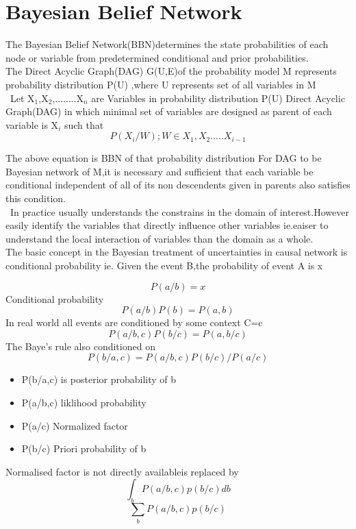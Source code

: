 \section{Bayesian Belief Network}
The Bayesian Belief Network(BBN)determines the state probabilities of each node or variable from predetermined conditional and prior probabilities.
\\ The Direct Acyclic Graph(DAG) G(U,E)of the probability model M represents probability distribution P(U) ,where U represents set of all variables in M
\\\ Let X${_1}$,X${_2}$,........X${_n}$ are Variables in probability distribution P(U)
Direct Acyclic Graph(DAG) in which minimal set of variables are designed as parent of each variable is X${_i}$ such that
\begin{equation}\label{}
   P(X{_i}/W);   W\in{X{_1},X{_2}.....X{_{i-1}}}
\end{equation}

The above equation is BBN of that probability distribution
For DAG to be Bayesian network of M,it is necessary and sufficient that each variable be conditional independent of all of its non descendents given in parents also satisfies this condition.
\\\
In practice usually understands the constrains in the domain of interest.However easily identify the variables that directly influence other variables ie.eaiser to understand the local interaction of variables than the domain as a whole.
\\
The basic concept in the Bayesian treatment of uncertainties in causal network is conditional probability ie.
Given the event B,the probability of event A is x

\begin{equation}
    P(a / b) = x
\end{equation}
Conditional probability
\begin{equation}
    P(a/b)P(b)=P(a,b)
\end{equation}
In real world all events are conditioned by some context C=c
\begin{equation}
    P(a/b,c)P(b/c)=P(a,b/c)
\end{equation}
The Baye's rule also conditioned on
\begin{equation}
 P(b/a,c)={P(a/b,c)P(b/c)} / {P(a/c)}
\end{equation}
\begin{itemize}
  \item P(b/a,c) is posterior probability of b
  \item P(a/b,c) liklihood probability
  \item P(a/c) Normalized factor
  \item P(b/c) Priori probability of b
\end{itemize}
Normalised factor is not directly availableis replaced by
\begin{equation}\label{}
    \int_{b} P(a/b,c)p(b/c)db
\end{equation}
\begin{equation}
    \sum_{b}P(a/b,c)p(b/c)
\end{equation}

